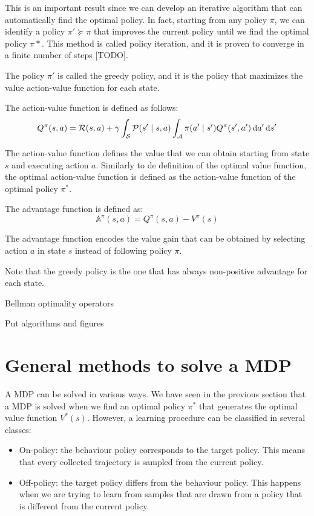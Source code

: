 This is an important result since we can develop an iterative algorithm that can automatically find the optimal policy. In fact, starting from any policy $\pi$, we can identify a policy $\pi' \succcurlyeq \pi$ that improves the current policy until we find the optimal policy $\pi*$. This method is called policy iteration, and it is proven to converge in a finite number of steps [TODO]. 

The policy $\pi'$ is called the greedy policy, and it is the policy that maximizes the value action-value function for each state. 

\begin{definition}
The action-value function is defined as follows:
\[
Q^{\pi}(s, a) = \mathcal{R}(s, a) + \gamma \int_{\mathcal{S}} \mathcal{P} (s' \mid s, a) \int_{\mathcal{A}} \pi(a' \mid s') Q^{\pi} (s', a') \, \textrm{d} a' \, \textrm{d} s'
\]
\end{definition}

The action-value function defines the value that we can obtain starting from state $s$ and executing action $a$. Similarly to de definition of the optimal value function, the optimal action-value function is defined as the action-value function of the optimal policy $\pi^*$. 

\begin{definition}[Advantage]
The advantage function is defined as:
\[
\mathbb{A}^{\pi}(s,a) = Q^{\pi}(s,a) - V^{\pi}(s)
\]
\end{definition}

The advantage function encodes the value gain that can be obtained by selecting action $a$ in state $s$ instead of following policy $\pi$. 


Note that the greedy policy is the one that has always non-positive advantage for each state. 


Bellman optimality operators

Put algorithms and figures

\section{General methods to solve a MDP}
A MDP can be solved in various ways. We have seen in the previous section that a MDP is solved when we find an optimal policy $\pi^*$ that generates the optimal value function $V^*(s)$. However, a learning procedure can be classified in several classes:
\begin{itemize}
\item On-policy: the behaviour policy corresponds to the target policy. This means that every collected trajectory is sampled from the current policy.
\item Off-policy: the target policy differs from the behaviour policy. This happens when we are trying to learn from samples that are drawn from a policy that is different from the current policy.
\end{itemize}

